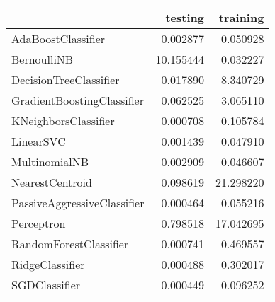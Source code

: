 \begin{tabular}{lrr}
\toprule
{} &    testing &   training \\
\midrule
AdaBoostClassifier          &   0.002877 &   0.050928 \\
BernoulliNB                 &  10.155444 &   0.032227 \\
DecisionTreeClassifier      &   0.017890 &   8.340729 \\
GradientBoostingClassifier  &   0.062525 &   3.065110 \\
KNeighborsClassifier        &   0.000708 &   0.105784 \\
LinearSVC                   &   0.001439 &   0.047910 \\
MultinomialNB               &   0.002909 &   0.046607 \\
NearestCentroid             &   0.098619 &  21.298220 \\
PassiveAggressiveClassifier &   0.000464 &   0.055216 \\
Perceptron                  &   0.798518 &  17.042695 \\
RandomForestClassifier      &   0.000741 &   0.469557 \\
RidgeClassifier             &   0.000488 &   0.302017 \\
SGDClassifier               &   0.000449 &   0.096252 \\
\bottomrule
\end{tabular}
